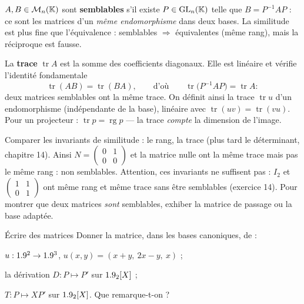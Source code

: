 
\begin{definition}[Similitude]
$A,B\in\mathcal{M}_n(\mathbb{K})$ sont \textbf{semblables} s'il existe
$P\in\operatorname{GL}_n(\mathbb{K})$ telle que $B=P^{-1}AP$ : ce sont les matrices
d'un \emph{même endomorphisme} dans deux bases. La similitude est plus
fine que l'équivalence : semblables $\Rightarrow$ équivalentes (même rang),
mais la réciproque est fausse.
\end{definition}

\begin{theoreme}[Trace]
La \textbf{trace} $\operatorname{tr}A$ est la somme des coefficients
diagonaux. Elle est linéaire et vérifie l'identité fondamentale
\[
\operatorname{tr}(AB)=\operatorname{tr}(BA),
\qquad\text{d'où}\qquad
\operatorname{tr}\bigl(P^{-1}AP\bigr)=\operatorname{tr}A :
\]
deux matrices semblables ont la même trace. On définit ainsi la trace
$\operatorname{tr}u$ d'un endomorphisme (indépendante de la base), linéaire
avec $\operatorname{tr}(uv)=\operatorname{tr}(vu)$. Pour un projecteur :
$\operatorname{tr}p=\operatorname{rg}p$ — la trace \emph{compte} la
dimension de l'image.
\end{theoreme}

\begin{savoirfaire}
Comparer les invariants de similitude : le rang, la trace (plus tard le
déterminant, chapitre 14). Ainsi
$N=\begin{pmatrix}0&1\\0&0\end{pmatrix}$ et la matrice nulle ont la même
trace mais pas le même rang : non semblables. Attention, ces invariants ne
suffisent pas : $I_2$ et $\begin{pmatrix}1&1\\0&1\end{pmatrix}$ ont même
rang et même trace sans être semblables (exercice 14). Pour montrer que
deux matrices \emph{sont} semblables, exhiber la matrice de passage ou la
base adaptée.
\end{savoirfaire}

\exercices
{}

\begin{exercice}[1]{Écrire des matrices}
Donner la matrice, dans les bases canoniques, de :
\begin{questions}
  \item $u:1.9^{2}\to1.9^{3}$, $u(x,y)=(x+y,\ 2x-y,\ x)$ ;
  \item la dérivation $D:P\mapsto P'$ sur $1.9_2[X]$ ;
  \item $T:P\mapsto XP'$ sur $1.9_2[X]$. Que remarque-t-on ?
\end{questions}
\end{exercice}

